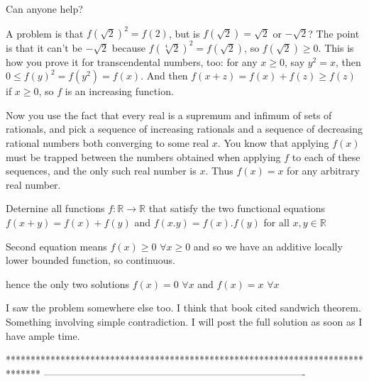 \begin{solution}
	Can anyone help?
\end{solution}



\begin{solution}
	A problem is that $f(\sqrt{2})^2=f(2)$, but is $f(\sqrt{2})=\sqrt{2}$ or $-\sqrt{2}$?  The point is that it can't be $-\sqrt{2}$ because $f(\sqrt[4]{2})^2=f(\sqrt{2})$, so $f(\sqrt{2})\geq 0$.  This is how you prove it for transcendental numbers, too: for any $x\geq 0$, say $y^2=x$, then $0\leq f(y)^2=f(y^2)=f(x)$.  And then $f(x+z)=f(x)+f(z)\geq f(z)$ if $x\geq 0$, so $f$ is an increasing function.

Now you use the fact that every real is a supremum and infimum of sets of rationals, and pick a sequence of increasing rationals and a sequence of decreasing rational numbers both converging to some real $x$.  You know that applying $f(x)$ must be trapped between the numbers obtained when applying $f$ to each of these sequences, and the only such real number is $x$.  Thus $f(x)=x$ for any arbitrary real number.
\end{solution}



\begin{solution}
	\begin{tcolorbox}Deternine all functions $f : \mathbb{R}\rightarrow \mathbb{R}$ that satisfy the two functional equations 
$ f\left (  x+y\right )=f\left ( x \right )+f\left ( y \right )$ and  $f\left ( x.y \right )=f\left ( x \right ).f\left ( y \right )$
for all $x,y \in \mathbb{R}$\end{tcolorbox}
Second equation means $f(x)\ge 0$ $\forall x\ge 0$ and so we have an additive locally lower bounded function, so continuous.

hence the only two solutions $f(x)=0$ $\forall x$ and $f(x)=x$ $\forall x$
\end{solution}



\begin{solution}
	I saw the problem somewhere else too.
I think that book cited sandwich theorem.
Something involving simple contradiction.
I will post the full solution as soon as I have ample time.
\end{solution}
*******************************************************************************
-------------------------------------------------------------------------------

